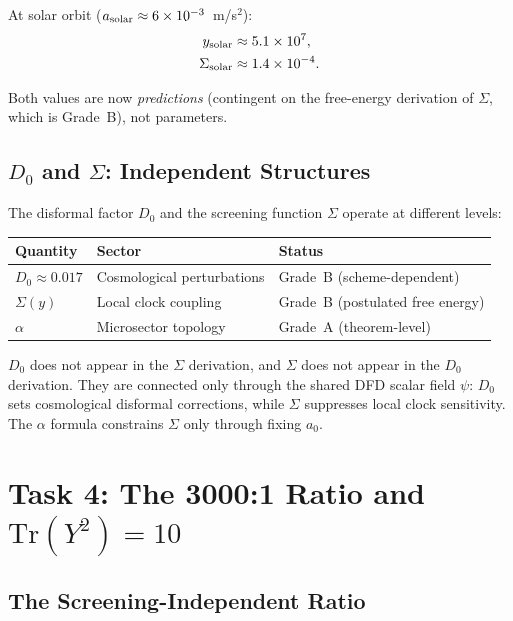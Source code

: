 \documentclass[11pt]{article}
\theoremstyle{definition}
\theoremstyle{remark}
\begin{document}
At solar orbit ($a_{\rm solar} \approx 6 \times 10^{-3}$~m/s$^2$):
\begin{align}
y_{\rm solar} &\approx 5.1 \times 10^7, \\
\Sigma_{\rm solar} &\approx 1.4 \times 10^{-4}.
\end{align}

Both values are now \emph{predictions} (contingent on the free-energy
derivation of $\Sigma$, which is Grade~B), not parameters.

\subsection{$D_0$ and $\Sigma$: Independent Structures}

The disformal factor $D_0$ and the screening function $\Sigma$ operate
at different levels:

\begin{center}
\begin{tabular}{lll}
\toprule
Quantity & Sector & Status \\
\midrule
$D_0 \approx 0.017$ & Cosmological perturbations & Grade~B (scheme-dependent) \\
$\Sigma(y)$ & Local clock coupling & Grade~B (postulated free energy) \\
$\alpha$ & Microsector topology & Grade~A (theorem-level) \\
\bottomrule
\end{tabular}
\end{center}

$D_0$ does not appear in the $\Sigma$ derivation, and $\Sigma$ does not
appear in the $D_0$ derivation. They are connected only through the shared
DFD scalar field $\psi$: $D_0$ sets cosmological disformal corrections,
while $\Sigma$ suppresses local clock sensitivity. The $\alpha$ formula
constrains $\Sigma$ only through fixing $a_0$.

\section{Task 4: The 3000:1 Ratio and $\mathrm{Tr}(Y^2) = 10$}
\label{sec:ratio}

\subsection{The Screening-Independent Ratio}
\end{document}
